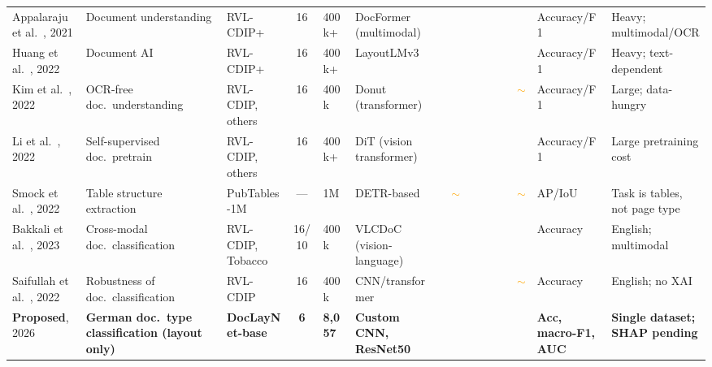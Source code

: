 \documentclass[preprint,12pt]{elsarticle}
\newcommand{\cmark}{\ding{51}} %
\newcommand{\xmark}{\ding{55}} %
\newcommand{\pmark}{\textcolor{orange}{$\sim$}} %
\begin{document}
\begin{table}[!ht]
\begin{adjustbox}{max width=\textwidth}
\begin{tabular}{p{2.0cm} p{2.1cm} p{1.7cm} c p{1.2cm} p{2.1cm} c c c c c c c p{2.2cm} p{2.5cm}}
Appalaraju et al.\ \cite{appalaraju2021docformer}, 2021 & Document understanding & RVL-CDIP+ & 16 & 400k+ & DocFormer (multimodal) & \cmark & \xmark & \cmark & \xmark & \xmark & \xmark & \xmark & Accuracy/F1 & Heavy; multimodal/OCR \\
Huang et al.\ \cite{huang2022layoutlmv3}, 2022 & Document AI & RVL-CDIP+ & 16 & 400k+ & LayoutLMv3 & \cmark & \xmark & \cmark & \xmark & \xmark & \xmark & \xmark & Accuracy/F1 & Heavy; text-dependent \\
Kim et al.\ \cite{kim2022donut}, 2022 & OCR-free doc.\ understanding & RVL-CDIP, others & 16 & 400k & Donut (transformer) & \cmark & \xmark & \cmark & \xmark & \xmark & \xmark & \pmark & Accuracy/F1 & Large; data-hungry \\
Li et al.\ \cite{li2022dit}, 2022 & Self-supervised doc.\ pretrain & RVL-CDIP, others & 16 & 400k+ & DiT (vision transformer) & \cmark & \xmark & \cmark & \xmark & \xmark & \xmark & \xmark & Accuracy/F1 & Large pretraining cost \\
Smock et al.\ \cite{smock2022pubtables}, 2022 & Table structure extraction & PubTables-1M & --- & 1M & DETR-based & \cmark & \pmark & \xmark & \xmark & \xmark & \xmark & \pmark & AP/IoU & Task is tables, not page type \\
Bakkali et al.\ \cite{bakkali2023vlcdoc}, 2023 & Cross-modal doc.\ classification & RVL-CDIP, Tobacco & 16/10 & 400k & VLCDoC (vision-language) & \cmark & \xmark & \cmark & \xmark & \xmark & \xmark & \xmark & Accuracy & English; multimodal \\
Saifullah et al.\ \cite{saifullah2022robust}, 2022 & Robustness of doc.\ classification & RVL-CDIP & 16 & 400k & CNN/transformer & \cmark & \xmark & \cmark & \xmark & \xmark & \cmark & \pmark & Accuracy & English; no XAI \\
\textbf{Proposed}, 2026 & \textbf{German doc.\ type classification (layout only)} & \textbf{DocLayNet-base} & \textbf{6} & \textbf{8{,}057} & \textbf{Custom CNN, ResNet50} & \cmark & \cmark & \cmark & \cmark & \xmark & \cmark & \cmark & \textbf{Acc, macro-F1, AUC} & \textbf{Single dataset; SHAP pending} \\
\bottomrule
\end{tabular}
\end{adjustbox}
\end{table}
\end{document}
